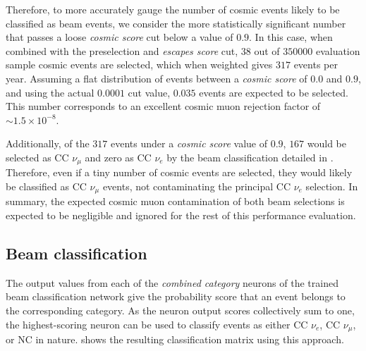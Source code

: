 Therefore, to more accurately gauge the number of cosmic events likely to be classified as beam
events, we consider the more statistically significant number that passes a loose \emph{cosmic
score} cut below a value of $0.9$. In this case, when combined with the preselection and
\emph{escapes score} cut, $38$ out of $350000$ evaluation sample cosmic events are selected, which
when weighted gives $317$ events per year. Assuming a flat distribution of events between a
\emph{cosmic score} of $0.0$ and $0.9$, and using the actual $0.0001$ cut value, $0.035$ events
are expected to be selected. This number corresponds to an excellent cosmic muon rejection factor
of $\sim1.5\times10^{-8}$.

Additionally, of the $317$ events under a \emph{cosmic score} value of $0.9$, $167$ would be
selected as CC $\nu_{\mu}$ and zero as CC $\nu_{e}$ by the beam classification detailed in
. Therefore, even if a tiny number of cosmic events are
selected, they would likely be classified as CC $\nu_{\mu}$ events, not contaminating the
principal CC $\nu_{e}$ selection. In summary, the expected cosmic muon contamination of both beam
selections is expected to be negligible and ignored for the rest of this performance evaluation.

\subsection{Beam classification} %
\label{sec:results_eval_beam} %

The output values from each of the \emph{combined category} neurons of the trained beam
classification network give the probability score that an event belongs to the corresponding
category. As the neuron output scores collectively sum to one, the highest-scoring neuron can be
used to classify events as either CC $\nu_{e}$, CC $\nu_{\mu}$, or NC in nature.
 shows the resulting classification matrix using this
approach.

